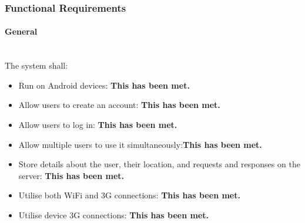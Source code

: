 \documentclass[a4paper]{article}
\newcommand{\subsubsubsection}[1]{\paragraph{#1}\mbox{}\\}
\begin{document}
\subsubsection{Functional Requirements}
\subsubsubsection{General}
The system shall:
\begin{itemize}
  \item Run on Android devices: \textbf{This has been met.}
  \item Allow users to create an account: \textbf{This has been met.}
  \item Allow users to log in: \textbf{This has been met.}
  \item Allow multiple users to use it simultaneously:\textbf{This has been met.}
  \item Store details about the user, their location, and requests and  responses on the server: \textbf{This has been met.}
  \item Utilise both WiFi and 3G connections: \textbf{This has been met.}
  \item Utilise device 3G connections: \textbf{This has been met.}
\end{itemize}
\end{document}
